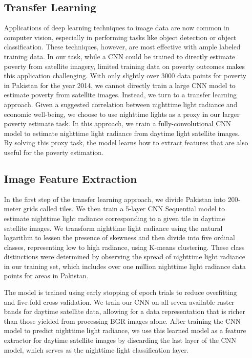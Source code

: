 \documentclass[8pt, oneside]{article}
\begin{document}
\subsection*{Transfer Learning}
Applications of deep learning techniques to image data are now common in computer vision, especially in performing tasks like object detection or object classification. These techniques, however, are most effective with ample labeled training data. In our task, while a CNN could be trained to directly estimate poverty from satellite imagery, limited training data on poverty outcomes makes this application challenging. With only slightly over 3000 data points for poverty in Pakistan for the year 2014, we cannot directly train a large CNN model to estimate poverty from satellite images. Instead, we turn to a transfer learning approach. Given a suggested correlation between nighttime light radiance and economic well-being, we choose to use nighttime lights as a proxy in our larger poverty estimate task. In this approach, we train a fully-convolutional CNN model to estimate nighttime light radiance from daytime light satellite images. By solving this proxy task, the model learns how to extract features that are also useful for the poverty estimation.

\subsection*{Image Feature Extraction}
In the first step of the transfer learning approach, we divide Pakistan into 200-meter grids called tiles. We then train a 5-layer CNN Sequential model to estimate nighttime light radiance corresponding to a given tile in daytime satellite images. We transform nighttime light radiance using the natural logarithm to lessen the presence of skewness and then divide into five ordinal classes, representing low to high radiance, using K-means clustering. These class distinctions were determined by observing the spread of nighttime light radiance in our training set, which includes over one million nighttime light radiance data points for areas in Pakistan. 
\par
The model is trained using early stopping of epoch trials to reduce overfitting and five-fold cross-validation. We train our CNN on all seven available raster bands for daytime satellite data, allowing for a data representation that is richer than those yielded from processing BGR images alone. After training the CNN model to predict nighttime light radiance, we use this learned model as a feature extractor for daytime satellite images by discarding the last layer of the CNN model, which serves as the nighttime light classification layer. 
\end{document}
